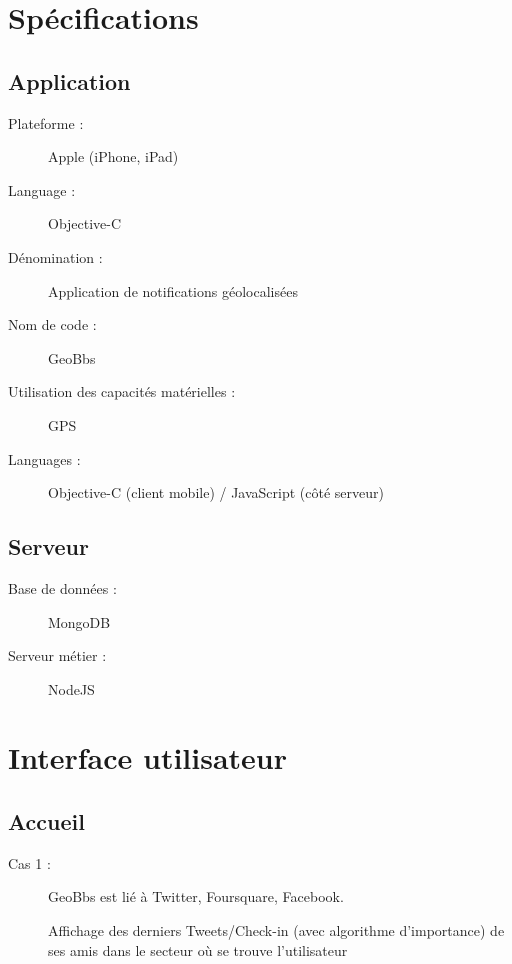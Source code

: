 \documentclass[a4paper,12pt]{report}
\begin{document}
\begin{onehalfspace}
	
	\chapter*{Spécifications}

	\section*{Application}
	
	\begin{description}
	\item[Plateforme :] Apple (iPhone, iPad)
	\item[Language :] Objective-C
	\item[Dénomination :] Application de notifications géolocalisées
	\item[Nom de code :] GeoBbs
	\item[Utilisation des capacités matérielles :] GPS
	\item[Languages :] Objective-C (client mobile) / JavaScript (côté serveur)
	\end{description}

	\section*{Serveur}

	\begin{description}
	\item[Base de données :] MongoDB
	\item[Serveur métier :] NodeJS
	\end{description}

	\newpage

	\chapter*{Interface utilisateur}
	
	\section*{Accueil}
	
	\begin{description}
		\item[Cas 1 :] GeoBbs est lié à Twitter, Foursquare, Facebook.

		Affichage des derniers Tweets/Check-in (avec algorithme d’importance) de ses amis dans le secteur où se trouve l’utilisateur


\end{description}
\end{onehalfspace}
\end{document}
